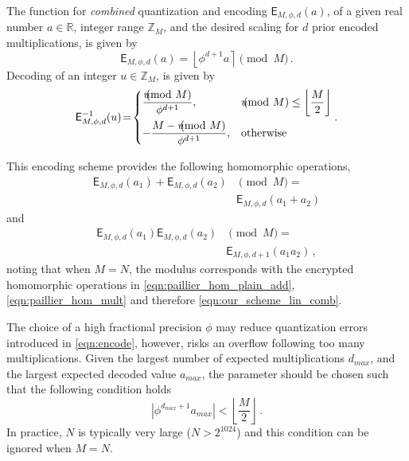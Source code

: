 \documentclass[10pt,letterpaper,oneside,twocolumn,journal]{IEEEtran}
\theoremstyle{definition}
\theoremstyle{definition}
\theoremstyle{remark}
\begin{document}
The function for \textit{combined} quantization and encoding $\mathsf{E}_{M,\phi,d}(a)$, of a given real number $a \in \mathbb{R}$, integer range $\mathbb{Z}_M$, and the desired scaling for $d$ prior encoded multiplications, is given by
\begin{equation}
    \mathsf{E}_{M,\phi,d}(a) = \left\lfloor \phi^{d+1} a \right\rceil \pmod{M}\,. \label{eqn:encode}
\end{equation}
Decoding of an integer $u \in \mathbb{Z}_M$, is given by
\begin{equation}
    \mathsf{E}^{-1}_{M,\phi,d}(u) \!=\! 
    \begin{dcases}
        \frac{u\hspace{-8pt}\pmod{M}}{\phi^{d+1}}, &u\hspace{-8pt}\pmod{M} \leq \left\lfloor\frac{M}{2}\right\rfloor \\
        -\frac{M - u\hspace{-8pt}\pmod{M}}{\phi^{d+1}}, &\text{otherwise} \\
    \end{dcases}.\label{eqn:decode}
\end{equation}

This encoding scheme provides the following homomorphic operations,
\begin{equation}
    \begin{split}
        \mathsf{E}_{M,\phi,d}(a_1) + \mathsf{E}_{M,\phi,d}(a_2)& \pmod{M} =\\
        &\mathsf{E}_{M,\phi,d}(a_1+a_2)
    \end{split}\label{eqn:encoding_homomorphic_add}
\end{equation}
and
\begin{equation}
    \begin{split}
        \mathsf{E}_{M,\phi,d}(a_1)\mathsf{E}_{M,\phi,d}(a_2)& \pmod{M} =\\
        &\mathsf{E}_{M,\phi,d+1}(a_1a_2)\,,
    \end{split}
\end{equation}
noting that when $M=N$, the modulus corresponds with the encrypted homomorphic operations in \eqref{eqn:paillier_hom_plain_add}, \eqref{eqn:paillier_hom_mult} and therefore \eqref{eqn:our_scheme_lin_comb}.

The choice of a high fractional precision $\phi$ may reduce quantization errors introduced in \eqref{eqn:encode}, however, risks an overflow following too many multiplications. Given the largest number of expected multiplications $d_{max}$, and the largest expected decoded value $a_{max}$, the parameter should be chosen such that the following condition holds
\begin{equation}
    \left|\phi^{d_{max}+1}a_{max}\right| < \left\lfloor \frac{M}{2} \right\rfloor\,.
\end{equation}
In practice, $N$ is typically very large ($N>2^{1024}$) and this condition can be ignored when $M=N$.
\end{document}
